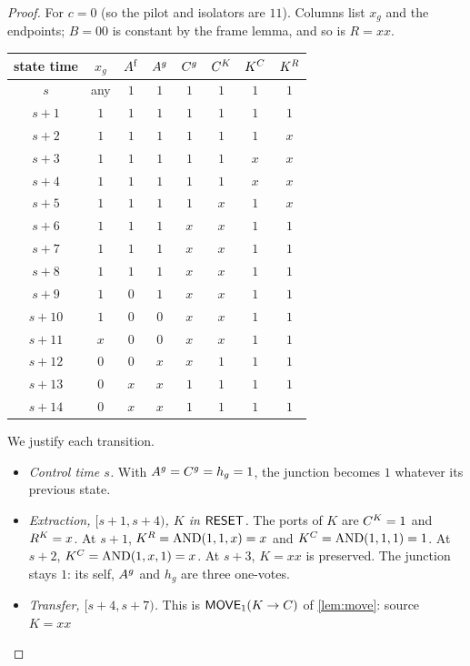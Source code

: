 \begin{proof}
For $c=0$ (so the pilot and isolators are $11$). Columns list $x_g$ and the endpoints; $B=00$ is
constant by the frame lemma, and so is $R=xx$.
\begin{center}\small
\begin{tabular}{cccccccc}\toprule
state time & $x_g$ & $A^{\mathrm f}$ & $A^{g}$ & $C^{g}$ & $C^{K}$ & $K^{C}$ & $K^{R}$\\\midrule
$s$    & any & $1$ & $1$ & $1$ & $1$ & $1$ & $1$\\
$s+1$  & $1$ & $1$ & $1$ & $1$ & $1$ & $1$ & $1$\\
$s+2$  & $1$ & $1$ & $1$ & $1$ & $1$ & $1$ & $x$\\
$s+3$  & $1$ & $1$ & $1$ & $1$ & $1$ & $x$ & $x$\\
$s+4$  & $1$ & $1$ & $1$ & $1$ & $1$ & $x$ & $x$\\
$s+5$  & $1$ & $1$ & $1$ & $1$ & $x$ & $1$ & $x$\\
$s+6$  & $1$ & $1$ & $1$ & $x$ & $x$ & $1$ & $1$\\
$s+7$  & $1$ & $1$ & $1$ & $x$ & $x$ & $1$ & $1$\\
$s+8$  & $1$ & $1$ & $1$ & $x$ & $x$ & $1$ & $1$\\
$s+9$  & $1$ & $0$ & $1$ & $x$ & $x$ & $1$ & $1$\\
$s+10$ & $1$ & $0$ & $0$ & $x$ & $x$ & $1$ & $1$\\
$s+11$ & $x$ & $0$ & $0$ & $x$ & $x$ & $1$ & $1$\\
$s+12$ & $0$ & $0$ & $x$ & $x$ & $1$ & $1$ & $1$\\
$s+13$ & $0$ & $x$ & $x$ & $1$ & $1$ & $1$ & $1$\\
$s+14$ & $0$ & $x$ & $x$ & $1$ & $1$ & $1$ & $1$\\\bottomrule
\end{tabular}
\end{center}
We justify each transition.
\begin{itemize}
\item \emph{Control time $s$.} With $A^{g}=C^{g}=h_g=1$, the junction becomes $1$ whatever its
  previous state.
\item \emph{Extraction, $[s+1,s+4)$, $K$ in $\textsf{RESET}$.} The ports of $K$ are $C^{K}=1$ and
  $R^{K}=x$. At $s+1$, $K^{R}=\operatorname{AND}(1,1,x)=x$ and $K^{C}=\operatorname{AND}(1,1,1)=1$. At $s+2$,
  $K^{C}=\operatorname{AND}(1,x,1)=x$. At $s+3$, $K=xx$ is preserved. The junction stays $1$: its self, $A^{g}$ and
  $h_g$ are three one-votes.
\item \emph{Transfer, $[s+4,s+7)$.} This is $\textsf{MOVE}_1(K\to C)$ of \cref{lem:move}: source $K=xx$

\end{itemize}
\end{proof}

